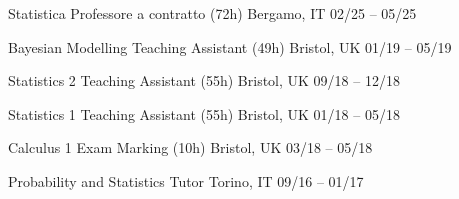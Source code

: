


\begin{cvhonors}

	
    \cvhonor
    {Statistica}
	{Professore a contratto (72h)}
	{Bergamo, IT}
	{02\slash 25 -- 05\slash 25}
	
    \cvhonor
    {Bayesian Modelling}
	{Teaching Assistant (49h)}
	{Bristol, UK}
	{01\slash 19 -- 05\slash 19}
	
    \cvhonor
    {Statistics 2}
	{Teaching Assistant (55h)}
	{Bristol, UK}
	{09\slash 18 -- 12\slash 18}
	
    \cvhonor
	{Statistics 1}
	{Teaching Assistant (55h)}
	{Bristol, UK}
	{01\slash 18 -- 05\slash 18}

    \cvhonor
	{Calculus 1}
	{Exam Marking (10h)}
	{Bristol, UK}
	{03\slash 18 -- 05\slash 18}
	
    \cvhonor
	{Probability and Statistics}
	{Tutor}
	{Torino, IT}
	{09\slash 16 -- 01\slash 17}

\end{cvhonors}

	

	

	
